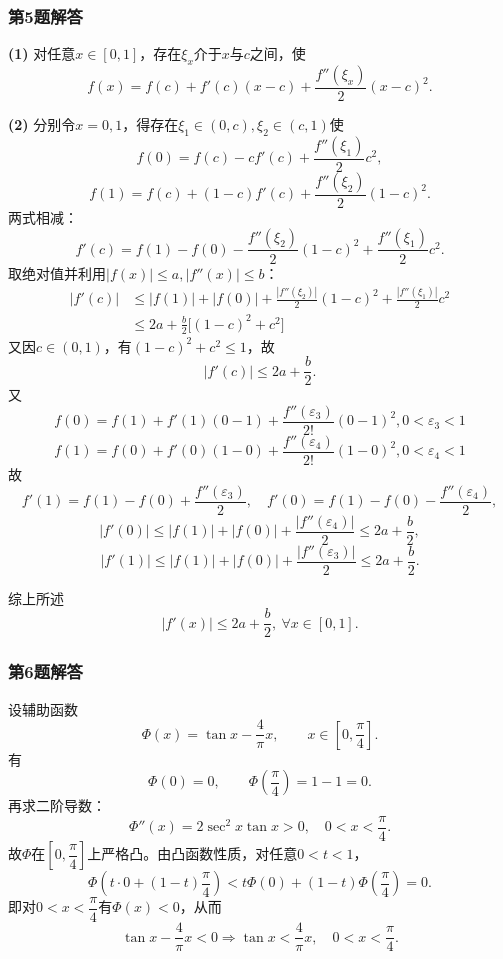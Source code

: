 \documentclass[./book.tex]{subfiles}
\begin{document}
    \subsubsection*{第5题解答}
    \begin{analysisbox}
        \textbf{(1)} 对任意$x\in[0,1]$，存在$\xi_x$介于$x$与$c$之间，使
        \[
            f(x)=f(c)+f'(c)(x-c)+\frac{f''(\xi_x)}{2}(x-c)^2.
        \]

        \textbf{(2)} 分别令$x=0,1$，得存在$\xi_1\in(0,c),\xi_2\in(c,1)$使
        \[
            f(0)=f(c)-cf'(c)+\frac{f''(\xi_1)}{2}c^2,
        \]
        \[
            f(1)=f(c)+(1-c)f'(c)+\frac{f''(\xi_2)}{2}(1-c)^2.
        \]
        两式相减：
        \[
            f'(c)=f(1)-f(0)-\frac{f''(\xi_2)}{2}(1-c)^2+\frac{f''(\xi_1)}{2}c^2.
        \]
        取绝对值并利用$\lvert f(x)\rvert\le a,\lvert f''(x)\rvert\le b$：
        \[
            \begin{aligned}
                |f'(c)|
                &\le |f(1)|+|f(0)|+\frac{|f''(\xi_2)|}{2}(1-c)^2+\frac{|f''(\xi_1)|}{2}c^2\\
                &\le 2a+\frac b2\bigl[(1-c)^2+c^2\bigr]
            \end{aligned}
        \]
        又因$c \in (0, 1)$，有$(1-c)^2+c^2 \leq 1$，故
        \[
            |f'(c)| \leq 2a + \frac{b}{2}.
        \]
        又
        \[
            f(0) = f(1) + f'(1)(0-1) + \dfrac{f''(\varepsilon_3)}{2!}(0-1)^2, 0 < \varepsilon_3 < 1
        \]
        \[
            f(1) = f(0) + f'(0)(1-0) + \dfrac{f''(\varepsilon_4)}{2!}(1-0)^2, 0 < \varepsilon_4 < 1
        \]
        故
        \[
            f'(1) = f(1)-f(0)+\frac{f''(\varepsilon_3)}{2},
            \quad
            f'(0) = f(1)-f(0)-\frac{f''(\varepsilon_4)}{2},
        \]
        \[
            |f'(0)| \le |f(1)|+|f(0)|+\frac{|f''(\varepsilon_4)|}{2}\le 2a+\frac b2,
        \]
        \[
            |f'(1)| \le |f(1)|+|f(0)|+\frac{|f''(\varepsilon_3)|}{2}\le 2a+\frac b2.
        \]

        综上所述
        \[
            \boxed{|f'(x)|\le 2a+\frac b2,\ \forall x\in[0,1].}
        \]
    \end{analysisbox}

    \subsubsection*{第6题解答}
    \begin{analysisbox}
        设辅助函数
        \[
            \Phi(x)=\tan x-\frac4\pi x,\qquad x\in\left[0,\frac\pi4\right].
        \]
        有
        \[
            \Phi(0)=0,\qquad \Phi\!\left(\frac\pi4\right)=1-1=0.
        \]
        再求二阶导数：
        \[
            \Phi''(x)=2\sec^2x\tan x>0,\quad 0<x<\frac\pi4.
        \]
        故$\Phi$在$\left[0,\dfrac\pi4\right]$上严格凸。由凸函数性质，对任意$0<t<1$，
        \[
            \Phi\!\left(t\cdot 0+(1-t)\frac\pi4\right)
            <t\Phi(0)+(1-t)\Phi\!\left(\frac\pi4\right)=0.
        \]
        即对$0<x<\dfrac\pi4$有$\Phi(x)<0$，从而
        \[
            \tan x-\frac4\pi x<0
            \Longrightarrow
            \boxed{\tan x<\frac4\pi x,\quad 0<x<\frac\pi4}.
        \]
    \end{analysisbox}
\end{document}
